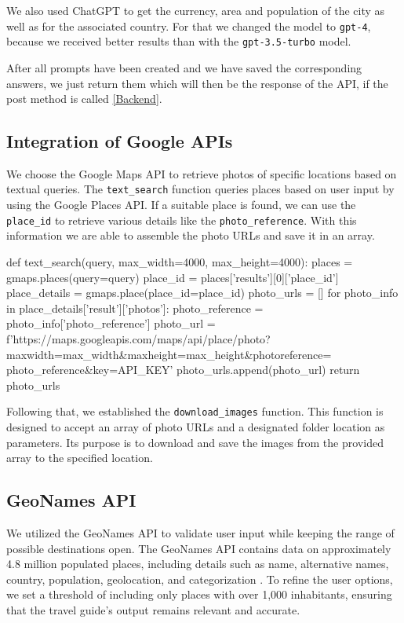 \documentclass[english,notitlepage,smartquotes]{hgbreport}
\begin{document}
We also used ChatGPT to get the currency, area and population of the city as well as for the associated country. For that we changed the model to \texttt{gpt-4}, because we received better results than with the \texttt{gpt-3.5-turbo} model.

After all prompts have been created and we have saved the corresponding answers, we just return them which will then be the response of the API, if the post method is called \ref{Backend}.

\subsection{Integration of Google APIs}
We choose the Google Maps API to retrieve photos of specific locations based on textual queries. The \texttt{text\_search} function queries places based on user input by using the Google Places API. If a suitable place is found, we can use the \texttt{place\_id} to retrieve various details like the \texttt{photo\_reference}. With this information we are able to assemble the photo URLs and save it in an array.
\begin{PythonCode}
	def text_search(query, max_width=4000, max_height=4000):
		places = gmaps.places(query=query)
		place_id = places['results'][0]['place_id']
		place_details = gmaps.place(place_id=place_id)
		photo_urls = []
		for photo_info in place_details['result']['photos']:
			photo_reference = photo_info['photo_reference']
			photo_url = f'https://maps.googleapis.com/maps/api/place/photo?
				maxwidth={max_width}&maxheight={max_height}&photoreference=
				{photo_reference}&key={API_KEY}'
			photo_urls.append(photo_url)
			return photo_urls
\end{PythonCode}
Following that, we established the \texttt{download\_images} function. This function is designed to accept an array of photo URLs and a designated folder location as parameters. Its purpose is to download and save the images from the provided array to the specified location.

\subsection{GeoNames API} \label{GeonamesAPI}
We utilized the GeoNames API\cite{geonamesDocu} to validate user input while keeping the range of possible destinations open. The GeoNames API contains data on approximately 4.8 million populated places, including details such as name, alternative names, country, population, geolocation, and categorization \cite{geonamesWebsite}. To refine the user options, we set a threshold of including only places with over 1,000 inhabitants, ensuring that the travel guide's output remains relevant and accurate.
\end{document}
